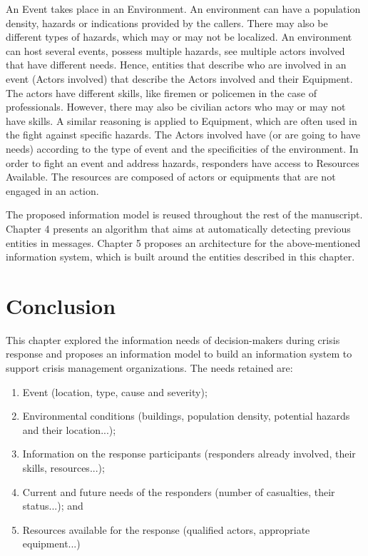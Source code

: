 An Event takes place in an Environment.
An environment can have a population density, hazards or indications provided by the callers.
There may also be different types of hazards, which may or may not be localized.
An environment can host several events, possess multiple hazards, see multiple actors involved
that have different needs.
Hence, entities that describe who are involved in an event (Actors involved) that describe the
Actors involved and their Equipment.
The actors have different skills, like firemen or policemen in the case of professionals.
However, there may also be civilian actors who may or may not have skills.
A similar reasoning is applied to Equipment, which are often used in the fight against specific hazards.
The Actors involved have (or are going to have needs) according to the type of event and the
specificities of the environment.
In order to fight an event and address hazards, responders have access to Resources Available.
The resources are composed of actors or equipments that are not engaged in an action.

The proposed information model is reused throughout the rest of the manuscript.
Chapter 4 presents an algorithm that aims at automatically detecting previous entities in messages.
Chapter 5 proposes an architecture for the above-mentioned information system, which is built around the entities described in this chapter.

\section{Conclusion}
This chapter explored the information needs of decision-makers during crisis response and
proposes an information model to build an information system to support crisis management organizations.
The needs retained are:

\begin{enumerate}
    \item Event (location, type, cause and severity);
    \item Environmental conditions (buildings, population density, potential hazards and their location...);
    \item Information on the response participants (responders already involved, their skills, resources...);
    \item Current and future needs of the responders (number of casualties, their status...); and
    \item Resources available for the response (qualified actors, appropriate equipment...)
\end{enumerate}

